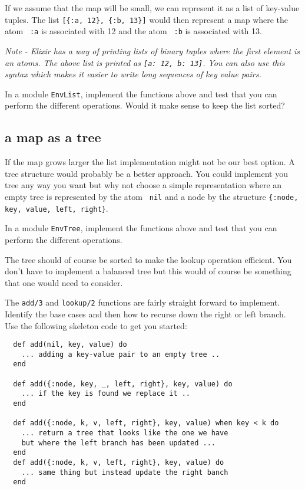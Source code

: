 \documentclass[a4paper,11pt]{article}
\begin{document}
If we assume that the map will be small, we can represent it as a list
of key-value tuples. The list \verb+[{:a, 12}, {:b, 13}]+ would then
represent a map where the atom \verb+ :a+ is associated with 12 and the
atom \verb+ :b+ is associated with 13.

{\em Note - Elixir has a way of printing lists of binary tuples where
  the first element is an atoms. The above list is printed as
  \verb+[a: 12, b: 13]+. You can also use this syntax which makes it
easier to write long sequences of key value pairs.}

In a module {\tt EnvList}, implement the functions above and test
that you can perform the different operations. Would it make sense to
keep the list sorted?

\subsection*{a map as a tree}

If the map grows larger the list implementation might not be our best
option. A tree structure would probably be a better approach. You
could implement you tree any way you want but why not choose a simple
representation where an empty tree is represented by the atom {\tt
  nil} and a node by the structure {\tt \{:node, key, value, left,
  right\}}.

In a module {\tt EnvTree}, implement the functions above and test that
you can perform the different operations.

The tree should of course be sorted to make the lookup operation
efficient. You don't have to implement a balanced tree but this would
of course be something that one would need to consider.

The {\tt add/3} and {\tt lookup/2} functions are fairly straight
forward to implement. Identify the base cases and then how to recurse
down the right or left branch. Use the following skeleton code to get
you started:

\begin{verbatim}
  def add(nil, key, value) do
    ... adding a key-value pair to an empty tree ..
  end

  def add({:node, key, _, left, right}, key, value) do 
    ... if the key is found we replace it .. 
  end

  def add({:node, k, v, left, right}, key, value) when key < k do
    ... return a tree that looks like the one we have
    but where the left branch has been updated ...
  end
  def add({:node, k, v, left, right}, key, value) do
    ... same thing but instead update the right banch
  end
\end{verbatim}
\end{document}
